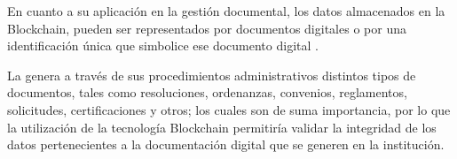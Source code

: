 En cuanto a su aplicación en la gestión documental, los datos 
almacenados en la  Blockchain, pueden ser representados por 
documentos digitales o por una identificación única que 
simbolice ese documento digital \cite[]{Blockchain_federal_argentina_bfa_2020}.

La  genera a 
través de sus procedimientos administrativos distintos tipos 
de documentos, tales como resoluciones, ordenanzas, convenios, 
reglamentos, solicitudes, certificaciones y otros; los cuales son 
de suma importancia, por lo que la utilización de la tecnología 
 Blockchain  permitiría validar la integridad de los datos 
pertenecientes a la documentación digital que se generen en la 
institución.